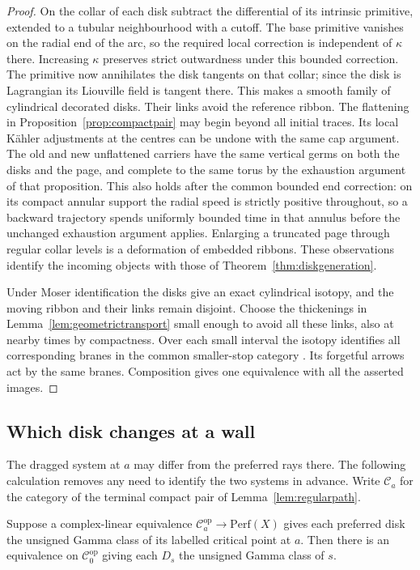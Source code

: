 \begin{proof}
On the collar of each disk subtract the differential of its intrinsic primitive, extended to a tubular neighbourhood with a cutoff. The base primitive vanishes on the radial end of the arc, so the required local correction is independent of $\kappa$ there. Increasing $\kappa$ preserves strict outwardness under this bounded correction. The primitive now annihilates the disk tangents on that collar; since the disk is Lagrangian its Liouville field is tangent there. This makes a smooth family of cylindrical decorated disks. Their links avoid the reference ribbon. The flattening in Proposition~\ref{prop:compactpair} may begin beyond all initial traces. Its local Kähler adjustments at the centres can be undone with the same cap argument. The old and new unflattened carriers have the same vertical germs on both the disks and the page, and complete to the same torus by the exhaustion argument of that proposition. This also holds after the common bounded end correction: on its compact annular support the radial speed is strictly positive throughout, so a backward trajectory spends uniformly bounded time in that annulus before the unchanged exhaustion argument applies. Enlarging a truncated page through regular collar levels is a deformation of embedded ribbons. These observations identify the incoming objects with those of Theorem~\ref{thm:diskgeneration}.

Under Moser identification the disks give an exact cylindrical isotopy, and the moving ribbon and their links remain disjoint. Choose the thickenings in Lemma~\ref{lem:geometrictransport} small enough to avoid all these links, also at nearby times by compactness. Over each small interval the isotopy identifies all corresponding branes in the common smaller-stop category \cite[\S2.4]{GPS}. Its forgetful arrows act by the same branes. Composition gives one equivalence with all the asserted images.
\end{proof}

\subsection{Which disk changes at a wall}
The dragged system at $a$ may differ from the preferred rays there. The following calculation removes any need to identify the two systems in advance. Write $\mathcal C_a$ for the category of the terminal compact pair of Lemma~\ref{lem:regularpath}.

\begin{proposition}\label{prop:markreduction}
Suppose a complex-linear equivalence $\mathcal C_a^{\mathrm{op}}\to\mathrm{Perf}(X)$ gives each preferred disk the unsigned Gamma class of its labelled critical point at $a$. Then there is an equivalence on $\mathcal C_0^{\mathrm{op}}$ giving each $D_s$ the unsigned Gamma class of $s$.
\end{proposition}

